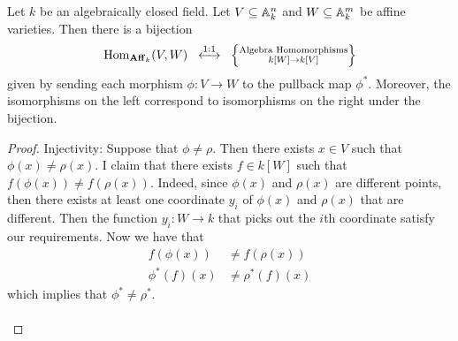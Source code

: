 \documentclass[a4paper]{article}
\begin{document}
\begin{prp}{}{} Let $k$ be an algebraically closed field. Let $V\subseteq\mathbb{A}_k^n$ and $W\subseteq\mathbb{A}_k^m$ be affine varieties. Then there is a bijection $$\operatorname{Hom}_{\bold{Aff}_k}(V,W)\;\;\overset{\text{1:1}}{\longleftrightarrow}\;\;\left\{\substack{\text{Algebra Homomorphisms}\\ k[W]\to k[V]}\right\}$$ given by sending each morphism $\phi:V\to W$ to the pullback map $\phi^\ast$. Moreover, the isomorphisms on the left correspond to isomorphisms on the right under the bijection. \tcbline
\begin{proof}
Injectivity: Suppose that $\phi\neq\rho$. Then there exists $x\in V$ such that $\phi(x)\neq\rho(x)$. I claim that there exists $f\in k[W]$ such that $f(\phi(x))\neq f(\rho(x))$. Indeed, since $\phi(x)$ and $\rho(x)$ are different points, then there exists at least one coordinate $y_i$ of $\phi(x)$ and $\rho(x)$ that are different. Then the function $y_i:W\to k$ that picks out the $i$th coordinate satisfy our requirements. Now we have that 
\begin{align*}
f(\phi(x))&\neq f(\rho(x))\\
\phi^\ast(f)(x)&\neq\rho^\ast(f)(x)
\end{align*}
which implies that $\phi^\ast\neq\rho^\ast$. \\~\\


\end{proof}
\end{prp}
\end{document}
